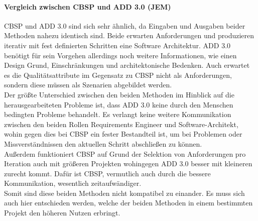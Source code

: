 \paragraph{Vergleich zwischen CBSP und ADD 3.0 (JEM)}
CBSP und ADD 3.0 sind sich sehr \"ahnlich, da Eingaben und Ausgaben beider Methoden nahezu identisch sind. Beide erwarten Anforderungen und produzieren iterativ mit fest definierten Schritten eine Software Architektur. ADD 3.0 ben\"otigt f\"ur sein Vorgehen allerdings noch weitere Informationen, wie einen Design Grund, Einschr\"ankungen und architektonische Bedenken. Auch erwartet es die Qualit\"atsattribute im Gegensatz zu CBSP nicht als Anforderungen, sondern diese m\"ussen als Szenarien abgebildet werden. \\

Der gr\"o\ss{}te Unterschied zwischen den beiden Methoden im Hinblick auf die herausgearbeiteten Probleme ist, dass ADD 3.0 keine durch den Menschen bedingten Probleme behandelt. Es verlangt keine weitere Kommunikation zwischen den beiden Rollen Requirements Engineer und Software-Architekt, wohin gegen dies bei CBSP ein fester Bestandteil ist, um bei Problemen oder Missverst\"andnissen den aktuellen Schritt abschlie\ss{}en zu k\"onnen. \\

Au\ss{}erdem funktioniert CBSP auf Grund der Selektion von Anforderungen pro Iteration auch mit gr\"o\ss{}eren Projekten wohingegen ADD 3.0 besser mit kleineren zurecht kommt. Daf\"ur ist CBSP, vermutlich auch durch die bessere Kommunikation, wesentlich zeitaufw\"andiger. \\

Somit sind diese beiden Methoden nicht kompatibel zu einander. Es muss sich auch hier entschieden werden, welche der beiden Methoden in einem bestimmten Projekt den h\"oheren Nutzen erbringt. \\
